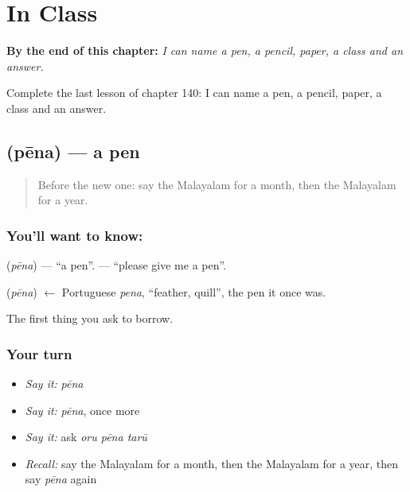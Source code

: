 
\chapter{In Class}
\label{ch:ml-in-class}

\begin{chapteropening}
\textbf{By the end of this chapter:} \emph{I can name a pen, a pencil, paper, a class and an answer.}

Complete the last lesson of chapter 140: I can name a pen, a pencil, paper, a class and an answer.
\end{chapteropening}

\section[\texorpdfstring{\ml{പേന} (pēna)}{പേന (pēna)}]{ (pēna) — a pen}

\label{lesson:ML-C140-pen}



\begin{quote}
Before the new one: say the Malayalam for a month, then the Malayalam for a year.
\end{quote}

\subsection*{You'll want to know: }
\textbf{} (\emph{pēna}) — \textquotedblleft{}a pen\textquotedblright{}. \textbf{  } — \textquotedblleft{}please give me a pen\textquotedblright{}.

\begin{cousinweb}
\textbf{} (\emph{pēna}) $\leftarrow$ Portuguese \emph{pena}, \textquotedblleft{}feather, quill\textquotedblright{}, the pen it once was.
\end{cousinweb}

\begin{grammarlens}[title={What you've built}]
The first thing you ask to borrow.
\end{grammarlens}

\subsection*{Your turn}
\begin{itemize}
\raggedright
  \item \emph{Say it:} \emph{pēna}
  \item \emph{Say it:} \emph{pēna}, once more
  \item \emph{Say it:} ask \emph{oru pēna tarū}
  \item \emph{Recall:} say the Malayalam for a month, then the Malayalam for a year, then say \emph{pēna} again
\end{itemize}

